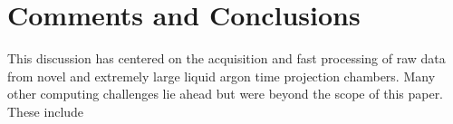 




\section{Comments and Conclusions}
This discussion has centered on the acquisition and fast processing of raw data from novel and extremely large liquid argon time projection chambers. Many other computing challenges lie ahead but were beyond the scope of this paper.  These include

